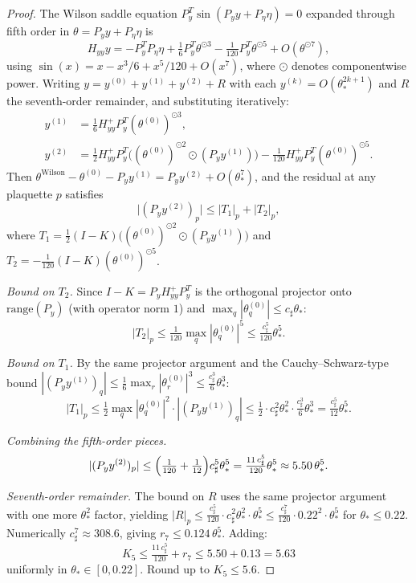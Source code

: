 \documentclass[11pt]{article}
\theoremstyle{definition}
\begin{document}
\begin{proof}
The Wilson saddle equation $P_y^T\sin(P_y y+P_\eta\eta)=0$ expanded
through fifth order in $\theta = P_y y + P_\eta\eta$ is
\[
H_{yy} y = -P_y^T P_\eta \eta + \tfrac{1}{6} P_y^T \theta^{\odot 3}
- \tfrac{1}{120} P_y^T \theta^{\odot 5} + O(\theta^{\odot 7}),
\]
using $\sin(x) = x - x^3/6 + x^5/120 + O(x^7)$, where $\odot$
denotes componentwise power.  Writing $y = y^{(0)} + y^{(1)} +
y^{(2)} + R$ with each $y^{(k)} = O(\theta_*^{2k+1})$ and $R$ the
seventh-order remainder, and substituting iteratively:
\begin{align*}
y^{(1)} &= \tfrac{1}{6} H_{yy}^+ P_y^T (\theta^{(0)})^{\odot 3}, \\
y^{(2)} &= \tfrac{1}{2} H_{yy}^+ P_y^T \bigl((\theta^{(0)})^{\odot 2}
\odot (P_y y^{(1)})\bigr) -
\tfrac{1}{120} H_{yy}^+ P_y^T (\theta^{(0)})^{\odot 5}.
\end{align*}
Then $\theta^{\mathrm{Wilson}} - \theta^{(0)} - P_y y^{(1)} = P_y y^{(2)} + O(\theta_*^7)$,
and the residual at any plaquette $p$ satisfies
\[
\bigl|(P_y y^{(2)})_p\bigr|
\le |T_1|_p + |T_2|_p,
\]
where $T_1 = \tfrac{1}{2} (I-K)\bigl((\theta^{(0)})^{\odot 2}\odot (P_y y^{(1)})\bigr)$
and $T_2 = -\tfrac{1}{120} (I-K)(\theta^{(0)})^{\odot 5}$.

\emph{Bound on $T_2$.}  Since $I-K = P_y H_{yy}^+ P_y^T$ is the
orthogonal projector onto $\mathrm{range}(P_y)$ \textup{(}with
operator norm $1$\textup{)} and
$\max_q |\theta_q^{(0)}| \le c_\sharp\theta_*$:
\[
|T_2|_p \le \tfrac{1}{120}\max_q|\theta_q^{(0)}|^5 \le \tfrac{c_\sharp^5}{120}\theta_*^5.
\]

\emph{Bound on $T_1$.}  By the same projector argument and the
Cauchy--Schwarz-type bound $|(P_y y^{(1)})_q| \le \tfrac{1}{6}\max_r|\theta_r^{(0)}|^3 \le \tfrac{c_\sharp^3}{6}\theta_*^3$:
\[
|T_1|_p \le \tfrac{1}{2}\max_q|\theta_q^{(0)}|^2\cdot |(P_y y^{(1)})_q|
\le \tfrac{1}{2}\cdot c_\sharp^2\theta_*^2\cdot\tfrac{c_\sharp^3}{6}\theta_*^3
= \tfrac{c_\sharp^5}{12}\theta_*^5.
\]

\emph{Combining the fifth-order pieces.}
\[
|(P_y y^{(2)})_p|\le \Bigl(\tfrac{1}{120}+\tfrac{1}{12}\Bigr)c_\sharp^5\theta_*^5
=\tfrac{11\,c_\sharp^5}{120}\theta_*^5
\approx 5.50\,\theta_*^5.
\]

\emph{Seventh-order remainder.}  The bound on $R$ uses the same
projector argument with one more $\theta_*^2$ factor, yielding
$|R|_p \le \tfrac{c_\sharp^5}{120}\cdot c_\sharp^2\theta_*^2\cdot\theta_*^5
\le \tfrac{c_\sharp^7}{120}\cdot 0.22^2\cdot \theta_*^5$ for $\theta_*\le 0.22$.
Numerically $c_\sharp^7\approx 308.6$, giving $r_7\le 0.124\,\theta_*^5$.
Adding:
\[
K_5\le \tfrac{11\,c_\sharp^5}{120}+r_7\le 5.50+0.13=5.63
\]
uniformly in $\theta_*\in[0,0.22]$.  Round up to $K_5\le 5.6$.
\end{proof}
\end{document}
